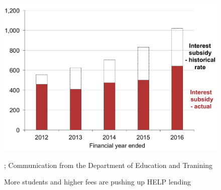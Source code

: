 \documentclass[embargoed]{grattan}
\begin{document}
\begin{figure}
\caption[More students and higher fees are pushing up {HELP} lending]{More students and higher fees are pushing up \gls{HELP} lending}\label{fig:fig4-more-students-higher-fees-are-pushing-up-HELP-lending}
\includegraphics[page=4]{atlas/Chartpack.pdf}

%
{\textcites{EducationvariousyearsHighereducationreport}{Government2016Budget201617}{ABS2016ConsumerPriceIndex}{Birmingham2016MediareleaseNew}; Communication from the Department of Education and Tranining}

\end{figure}
\end{document}
